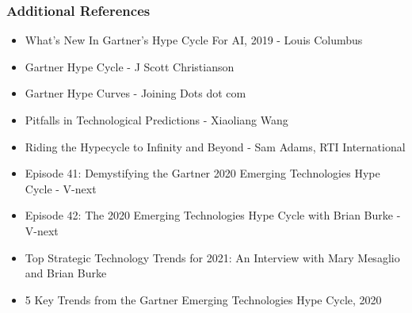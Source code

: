 \begin{frame}[fragile]\frametitle{Additional References}


\begin{itemize}
\item What's New In Gartner's Hype Cycle For AI, 2019 - Louis Columbus
\item Gartner Hype Cycle - J Scott Christianson
\item Gartner Hype Curves - Joining Dots dot com
\item Pitfalls in Technological Predictions - Xiaoliang Wang
\item Riding the Hypecycle to Infinity and Beyond - Sam Adams, RTI International
\item Episode 41: Demystifying the Gartner 2020 Emerging Technologies Hype Cycle - V-next
\item Episode 42: The 2020 Emerging Technologies Hype Cycle with Brian Burke - V-next
\item Top Strategic Technology Trends for 2021: An Interview with Mary Mesaglio and Brian Burke
\item 5 Key Trends from the Gartner Emerging Technologies Hype Cycle, 2020
\end{itemize}

\end{frame}


